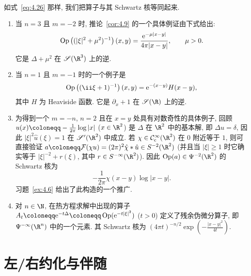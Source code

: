 \begin{example}\label{eg:4.10}
如式~\eqref{eq:4.26} 那样, 我们把算子与其 Schwartz 核等同起来.
\begin{enumerate}
    \item 当 $n = 3$ 且 $m = -2$ 时, 推论~\ref{cor:4.9} 的一个具体例证由下式给出:
    \begin{equation}\label{eq:4.45}
        \operatorname{Op}\left( (|\xi|^2 + \mu^2)^{-1} \right)(x, y) = \frac{\mathrm{e}^{-\mu |x-y|}}{4\pi |x - y|}, \qquad \mu > 0.
    \end{equation}
    它是 $\Delta + \mu^2$ 在 $\Schwartz(\R^3)$ 上的逆.
    \item 当 $n = 1$ 且 $m = -1$ 时的一个例子是
    \begin{equation}\label{eq:4.46}
        \Op\left( (\ii \xi + 1)^{-1} \right)(x, y) = \ee^{-(x-y)} H(x - y),
    \end{equation}
    其中 $H$ 为 Heaviside 函数. 它是 $\partial_x + 1$ 在 $\Schwartz(\R)$ 上的逆.
    \item 为得到一个 $m = -n$, $n = 2$ 且在 $x = y$ 处具有对数奇性的具体例子, 回顾
    $u(x) \defeq -\frac{1}{2\pi} \log |x|$ ($x \in \R^2$) 是 $\Delta$ 在 $\R^2$ 中的基本解,
    即 $\Delta u = \delta$, 因此 $|\xi|^2 \hat{u}(\xi) = 1$ 在 $\TempDistr(\R^2)$ 中成立.
    若 $\chi \in \SmoothComp(\R^2)$ 在 $0$ 附近等于 $1$, 则可直接验证
    $a \defeq \mathcal{F}(\chi u) = (2\pi)^2 \hat{\chi} * \hat{u} \in S^{-2}(\R^2)$
    (并且当 $|\xi| \ge 1$ 时它确实等于 $|\xi|^{-2} + r(\xi)$, 其中 $r \in S^{-\infty}(\R^2)$).
    因此 $\Op(a) \in \Psi^{-2}(\R^2)$ 的 Schwartz 核为
    \begin{equation}\label{eq:4.47}
        -\frac{1}{2\pi} \chi(x - y) \log |x - y|.
    \end{equation}
    习题~\ref{ex:4.6} 给出了此构造的一个推广.
    \item 对 $n \in \N$, 在热方程求解中出现的算子
    $A_t \defeq \ee^{-t \Delta} \defeq \Op(\ee^{-t |\xi|^2})$ ($t > 0$) 定义了残余伪微分算子,
    即 $\Psi^{-\infty}(\R^n)$ 中的一个元素. 其 Schwartz 核为
    $(4\pi t)^{-n/2} \exp\left( -\frac{|x-y|^2}{4t} \right)$.
\end{enumerate}
\end{example}

\section{左/右约化与伴随}\label{sec:4.2}
%
%
%

